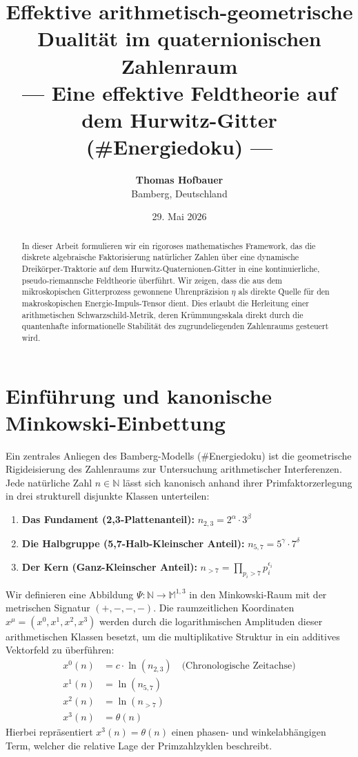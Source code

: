 \documentclass[11pt,a4paper,nofootinbib]{article}
\title{\textbf{Effektive arithmetisch-geometrische Dualität im quaternionischen Zahlenraum}\\
\large --- Eine effektive Feldtheorie auf dem Hurwitz-Gitter (\#Energiedoku) ---}
\author{\textbf{Thomas Hofbauer} \\
\small Bamberg, Deutschland}
\date{\small 29. Mai 2026}
\begin{document}
\maketitle

\begin{abstract}
In dieser Arbeit formulieren wir ein rigoroses mathematisches Framework, das die diskrete algebraische Faktorisierung natürlicher Zahlen über eine dynamische Dreikörper-Traktorie auf dem Hurwitz-Quaternionen-Gitter in eine kontinuierliche, pseudo-riemannsche Feldtheorie überführt. Wir zeigen, dass die aus dem mikroskopischen Gitterprozess gewonnene Uhrenpräzision $\eta$ als direkte Quelle für den makroskopischen Energie-Impuls-Tensor dient. Dies erlaubt die Herleitung einer arithmetischen Schwarzschild-Metrik, deren Krümmungsskala direkt durch die quantenhafte informationelle Stabilität des zugrundeliegenden Zahlenraums gesteuert wird.
\end{abstract}

\section{Einführung und kanonische Minkowski-Einbettung}
Ein zentrales Anliegen des Bamberg-Modells (\#Energiedoku) ist die geometrische Rigideisierung des Zahlenraums zur Untersuchung arithmetischer Interferenzen. Jede natürliche Zahl $n \in \mathbb{N}$ lässt sich kanonisch anhand ihrer Primfaktorzerlegung in drei strukturell disjunkte Klassen unterteilen:
\begin{enumerate}
    \item \textbf{Das Fundament (2,3-Plattenanteil):} $n_{2,3} = 2^{\alpha} \cdot 3^{\beta}$
    \item \textbf{Die Halbgruppe (5,7-Halb-Kleinscher Anteil):} $n_{5,7} = 5^{\gamma} \cdot 7^{\delta}$
    \item \textbf{Der Kern (Ganz-Kleinscher Anteil):} $n_{>7} = \prod_{p_i > 7} p_i^{\epsilon_i}$
\end{enumerate}

Wir definieren eine Abbildung $\Psi: \mathbb{N} \to \mathbb{M}^{1,3}$ in den Minkowski-Raum mit der metrischen Signatur $(+,-,-,-)$. Die raumzeitlichen Koordinaten $x^\mu = (x^0, x^1, x^2, x^3)$ werden durch die logarithmischen Amplituden dieser arithmetischen Klassen besetzt, um die multiplikative Struktur in ein additives Vektorfeld zu überführen:
\begin{align}
    x^0(n) &= c \cdot \ln(n_{2,3}) \quad \text{(Chronologische Zeitachse)} \\
    x^1(n) &= \ln(n_{5,7}) \\
    x^2(n) &= \ln(n_{>7}) \\
    x^3(n) &= \theta(n)
\end{align}
Hierbei repräsentiert $x^3(n) = \theta(n)$ einen phasen- und winkelabhängigen Term, welcher die relative Lage der Primzahlzyklen beschreibt.
\end{document}
